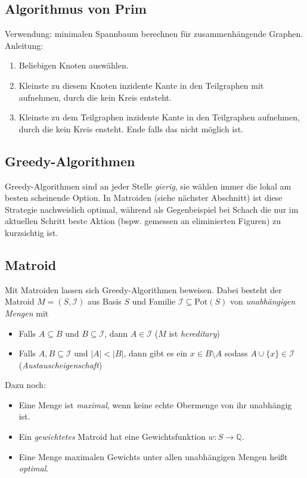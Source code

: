 \documentclass[11pt]{scrartcl}
\begin{document}
\subsection{Algorithmus von Prim}
Verwendung: minimalen Spannbaum berechnen für zusammenhängende Graphen.
Anleitung:
\begin{enumerate}
\item Beliebigen Knoten auswählen.
\item Kleinste zu diesem Knoten inzidente Kante in den Teilgraphen mit aufnehmen, durch die kein Kreis entsteht.
\item Kleinste zu dem Teilgraphen inzidente Kante in den Teilgraphen aufnehmen, durch die kein Kreis ensteht. Ende falls das nicht möglich ist.
\end{enumerate}
\subsection{Greedy-Algorithmen}

Greedy-Algorithmen sind an jeder Stelle \textit{gierig}, sie wählen immer die lokal am besten scheinende Option. In Matroiden (siehe nächster Abschnitt) ist diese Strategie nachweislich optimal, während als Gegenbeispiel bei Schach die nur im aktuellen Schritt beste Aktion (bspw. gemessen an eliminierten Figuren) zu kurzsichtig ist.

\subsection{Matroid}

Mit Matroiden lassen sich Greedy-Algorithmen beweisen. Dabei besteht der Matroid $M = (S, \mathcal{I})$ aus Basis $S$ und Familie $\mathcal{I} \subseteq \textrm{Pot}(S)$ von \textit{unabhängigen Mengen} mit

\begin{itemize}
\item Falls $A \subseteq B$ und $B \subseteq \mathcal{I}$, dann $A \in \mathcal{I}$ ($M$ ist \textit{hereditary})
\item Falls $A, B \subseteq \mathcal{I}$ und $|A| < |B|$, dann gibt es ein $x \in B \setminus A$ sodass $A \cup \{x\} \in \mathcal{I}$ (\textit{Austauscheigenschaft})
\end{itemize}

Dazu noch:
\begin{itemize}
\item Eine Menge ist \textit{maximal}, wenn keine echte Obermenge von ihr unabhängig ist.
\item Ein \textit{gewichtetes} Matroid hat eine Gewichtsfunktion $w : S \to \mathbb{Q}$.
\item Eine Menge maximalen Gewichts unter allen unabhängigen Mengen heißt \textit{optimal}.
\end{itemize}
\end{document}
